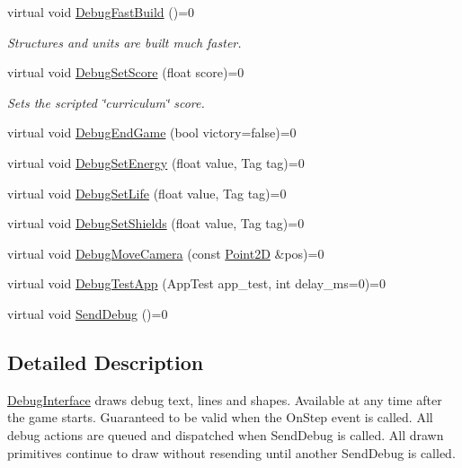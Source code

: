 \begin{DoxyCompactItemize}
\mbox{\label{classsc2_1_1_debug_interface_a75a1c2a43f05b3fcfc310d85882c63f3}} 
virtual void \hyperlink{classsc2_1_1_debug_interface_a75a1c2a43f05b3fcfc310d85882c63f3}{Debug\+Fast\+Build} ()=0
\begin{DoxyCompactList}\small\item\em Structures and units are built much faster. \end{DoxyCompactList}\item 
\mbox{\label{classsc2_1_1_debug_interface_a0e14deec5d84d341f4f3aefc29a198d5}} 
virtual void \hyperlink{classsc2_1_1_debug_interface_a0e14deec5d84d341f4f3aefc29a198d5}{Debug\+Set\+Score} (float score)=0
\begin{DoxyCompactList}\small\item\em Sets the scripted \char`\"{}curriculum\char`\"{} score. \end{DoxyCompactList}\item 
virtual void \hyperlink{classsc2_1_1_debug_interface_afba1e9cbd642833e0de4360aba7ff08e}{Debug\+End\+Game} (bool victory=false)=0
\item 
virtual void \hyperlink{classsc2_1_1_debug_interface_a3049f5181825a014b8f05c75af8c254b}{Debug\+Set\+Energy} (float value, Tag tag)=0
\item 
virtual void \hyperlink{classsc2_1_1_debug_interface_aebec7aae013f15f2791dd17af6d9e320}{Debug\+Set\+Life} (float value, Tag tag)=0
\item 
virtual void \hyperlink{classsc2_1_1_debug_interface_a003a4d12d81cfb02078623b255b16d17}{Debug\+Set\+Shields} (float value, Tag tag)=0
\item 
virtual void \hyperlink{classsc2_1_1_debug_interface_aafe669615586b51805c6bf3e9cef7bf1}{Debug\+Move\+Camera} (const \hyperlink{structsc2_1_1_point2_d}{Point2D} \&pos)=0
\item 
virtual void \hyperlink{classsc2_1_1_debug_interface_a9a6fd0d4719dea83de3f5e374127a1da}{Debug\+Test\+App} (App\+Test app\+\_\+test, int delay\+\_\+ms=0)=0
\item 
virtual void \hyperlink{classsc2_1_1_debug_interface_ae08bd0e07c9ed54c61a2f35225b2efb5}{Send\+Debug} ()=0
\end{DoxyCompactItemize}


\subsection{Detailed Description}
\hyperlink{classsc2_1_1_debug_interface}{Debug\+Interface} draws debug text, lines and shapes. Available at any time after the game starts. Guaranteed to be valid when the On\+Step event is called. All debug actions are queued and dispatched when Send\+Debug is called. All drawn primitives continue to draw without resending until another Send\+Debug is called. 

